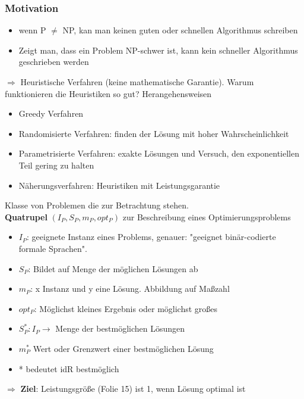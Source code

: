 \documentclass[ngerman]{scrartcl}
\begin{document}
\subsubsection{Motivation}
\begin{itemize}
  \item wenn P $ \neq $ NP, kan man keinen guten oder schnellen Algorithmus schreiben
  \item Zeigt man, dass ein Problem NP-schwer ist, kann kein schneller Algorithmus geschrieben werden  
\end{itemize}
$\Rightarrow$ Heuristische Verfahren (keine mathematische Garantie). Warum funktionieren die Heuristiken so gut?
Herangehensweisen
\begin{itemize}
  \item Greedy Verfahren
  \item Randomisierte Verfahren: finden der Lösung mit hoher Wahrscheinlichkeit
  \item Parametrisierte Verfahren: exakte Lösungen und Versuch, den exponentiellen Teil gering zu halten
  \item Näherungsverfahren: Heuristiken mit Leistungsgarantie
\end{itemize}
Klasse von Problemen die zur Betrachtung stehen. \\
\textbf{Quatrupel} $ (I_P, S_P, m_P , opt_P) $ zur Beschreibung eines Optimierungsproblems
\begin{itemize}
  \item $ I_P $: geeignete Instanz eines Problems, genauer: "geeignet binär-codierte formale Sprachen".
  \item $ S_P $: Bildet auf Menge der möglichen Lösungen ab
  \item $ m_P $: x Instanz und y eine Lösung. Abbildung auf Maßzahl
  \item $ opt_P $: Möglichst kleines Ergebnis oder möglichst großes
\end{itemize}
\begin{itemize}
  \item $ S_P^*: I_P \rightarrow $ Menge der bestmöglichen Lösungen
  \item $ m_P^* $ Wert oder Grenzwert einer bestmöglichen Lösung
  \item * bedeutet idR bestmöglich
\end{itemize}
$\Rightarrow$ \textbf{Ziel}: Leistungsgröße (Folie 15) ist 1, wenn Lösung optimal ist
\end{document}
